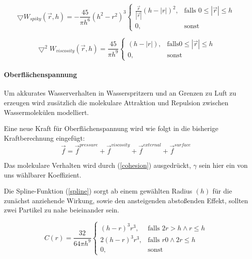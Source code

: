 \documentclass[a4paper]{paper}
\begin{document}
\begin{equation}
\label{spiky}
\bigtriangledown W_{spiky}(\vec{r},h) = -\frac{45}{\pi h^6} (h^2-r^2)^3
\begin{cases}
\frac{\vec{r}}{|\vec{r}|}(h-|r|)^2, & \text{falls } 0 \leq |\vec{r}| \leq h\\
0, & \text{sonst}
\end{cases}
\end{equation}

\begin{equation}
\label{viscosity}
\bigtriangledown^2 W_{viscosity}(\vec{r},h) = \frac{45}{\pi h^9} 
\begin{cases}
(h-|r|),& \text{falls} 0 \leq |\vec{r}| \leq h \\
0, & \text{sonst}
\end{cases}
\end{equation}


\paragraph{Oberflächenspannung}
Um akkurates Wasserverhalten in Wasserspritzern und an Grenzen zu Luft zu erzeugen wird zusätzlich die molekulare Attraktion und Repulsion zwischen Wassermolekülen modelliert.

Eine neue Kraft für Oberflächenspannung wird wie folgt in die bisherige Kraftberechnung eingefügt:
\begin{equation}
\label{force_with_surface}
\vec{f} = \vec{f}^{pressure} + \vec{f}^{viscosity} + \vec{f}^{external} + \vec{f}^{surface}
\end{equation}


Das molekulare Verhalten wird durch (\ref{cohesion}) ausgedrückt, $\gamma$ sein hier ein von uns wählbarer Koeffizient.

Die Spline-Funktion (\ref{spline}) sorgt ab einem gewählten Radius $(h)$ für die zunächst anziehende Wirkung, sowie den ansteigenden abstoßenden Effekt, sollten zwei Partikel zu nahe beieinander sein.

\begin{equation}
\label{spline}
C(r) = \frac{32}{64 \pi h^9}
\begin{cases}
(h-r)^3r^3,  &\text{falls }  2r > h \land r \leq h\\
2(h-r)^3r^3, &\text{falls } r  0 \land 2r \leq h\\
0,&\text{sonst}  
\end{cases}
\end{equation}
\end{document}
